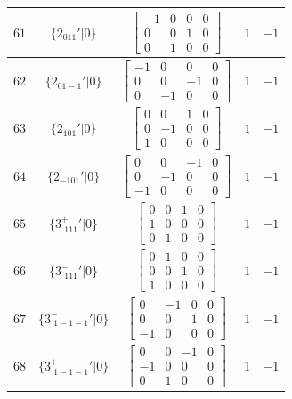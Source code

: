 \documentclass[fleqn,8pt]{jsarticle}
\begin{document}
\begin{longtable}{ccccc}
$ 61 $ & $ \{2{}_{011}{}'|0\} $ & $ \begin{bmatrix} -1 & 0 & 0 & 0 \\ 0 & 0 & 1 & 0 \\ 0 & 1 & 0 & 0 \end{bmatrix} $ & $ 1 $ & $ -1 $ \\ \hline
$ 62 $ & $ \{2{}_{01-1}{}'|0\} $ & $ \begin{bmatrix} -1 & 0 & 0 & 0 \\ 0 & 0 & -1 & 0 \\ 0 & -1 & 0 & 0 \end{bmatrix} $ & $ 1 $ & $ -1 $ \\ \hline
$ 63 $ & $ \{2{}_{101}{}'|0\} $ & $ \begin{bmatrix} 0 & 0 & 1 & 0 \\ 0 & -1 & 0 & 0 \\ 1 & 0 & 0 & 0 \end{bmatrix} $ & $ 1 $ & $ -1 $ \\ \hline
$ 64 $ & $ \{2{}_{-101}{}'|0\} $ & $ \begin{bmatrix} 0 & 0 & -1 & 0 \\ 0 & -1 & 0 & 0 \\ -1 & 0 & 0 & 0 \end{bmatrix} $ & $ 1 $ & $ -1 $ \\ \hline
$ 65 $ & $ \{3^{+}_{\,\,111}{}'|0\} $ & $ \begin{bmatrix} 0 & 0 & 1 & 0 \\ 1 & 0 & 0 & 0 \\ 0 & 1 & 0 & 0 \end{bmatrix} $ & $ 1 $ & $ -1 $ \\ \hline
$ 66 $ & $ \{3^{-}_{\,\,111}{}'|0\} $ & $ \begin{bmatrix} 0 & 1 & 0 & 0 \\ 0 & 0 & 1 & 0 \\ 1 & 0 & 0 & 0 \end{bmatrix} $ & $ 1 $ & $ -1 $ \\ \hline
$ 67 $ & $ \{3^{-}_{\,\,1-1-1}{}'|0\} $ & $ \begin{bmatrix} 0 & -1 & 0 & 0 \\ 0 & 0 & 1 & 0 \\ -1 & 0 & 0 & 0 \end{bmatrix} $ & $ 1 $ & $ -1 $ \\ \hline
$ 68 $ & $ \{3^{+}_{\,\,1-1-1}{}'|0\} $ & $ \begin{bmatrix} 0 & 0 & -1 & 0 \\ -1 & 0 & 0 & 0 \\ 0 & 1 & 0 & 0 \end{bmatrix} $ & $ 1 $ & $ -1 $ \\ \hline

\end{longtable}
\end{document}
